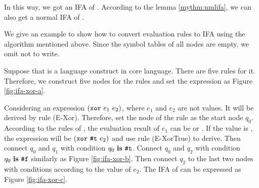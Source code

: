 In this way, we got an IFA of . According to the lemma \ref{mythm:nmlifa}, we can also get a normal IFA of .

\begin{example}

    We give an example to show how to convert evaluation rules to IFA using the algorithm mentioned above. Since the symbol tables of all nodes are empty, we omit not to write.


    Suppose that  is a language construct in core language. There are five rules for it. Therefore, we construct five nodes for the rules and set the expression as Figure \ref{fig:ifa-xor-a}.

    Considering an expression $(\mbox{\tt xor}~e_1~e_2)$, where $e_1$ and $e_2$ are not values. It will be derived by rule (E-Xor). Therefore, set the node of the rule as the start node $q_0$. According to the rules of , the evaluation result of $e_1$ can be  or . If the value is , the expression will be $(\mbox{\tt xor}~\mbox{\tt \#t}~e_2)$ and use rule (E-XorTrue) to derive. Then connect $q_0$ and $q_1$ with condition $q_0~\mbox{\rm \bf is}~\mbox{\tt \#t}$. Connect $q_0$ and $q_2$ with condition $q_0~\mbox{\rm \bf is}~\mbox{\tt \#f}$ similarly as Figure \ref{fig:ifa-xor-b}. Then connect $q_2$ to the last two nodes with conditions according to the value of $e_2$. The IFA of  can be expressed as Figure \ref{fig:ifa-xor-c}.
    \myend
\end{example}

